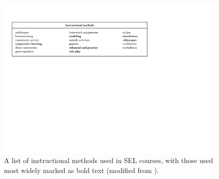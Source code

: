 \documentclass[prodmode,acmtochi]{acmsmall}
\newcommand{\qq}[2]{\textrm{\textit{``#2''}}{ [#1]}}
\begin{document}
\begin{figure}
  \centering
	\includegraphics[width=.98\textwidth]{images/Elias-methodsList.pdf}
	\caption{A list of instructional methods used in SEL courses, with those used most widely marked as bold text (modified from \cite[p.109]{Elias1997}).}
	\label{fig:methods}
\end{figure}





\end{document}
